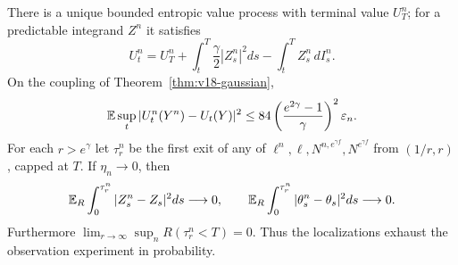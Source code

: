 \begin{theorem}
\label{thm:v18-entropic}
There is a unique bounded entropic value process with terminal value
$U_T^n$; for a predictable integrand $Z^n$ it satisfies
\begin{equation}\label{eq:v18-bsde}
 U_t^n=U_T^n+\int_t^T\frac\gamma2|Z_s^n|^2ds
                        -\int_t^T Z_s^n\,dI_s^n.
\end{equation}
On the coupling of Theorem~\ref{thm:v18-gaussian},
\begin{equation}\label{eq:v18-entropiccoupling}
 \mathbb E\sup_t|U_t^n(Y^n)-U_t(Y)|^2
       \le84\left(\frac{e^{2\gamma}-1}{\gamma}\right)^2
                                                     \varepsilon_n.
\end{equation}
For each $r>e^\gamma$ let $\tau_r^n$ be the first exit of any of
$\ell^n,\ell,N^{n,e^{\gamma f}},N^{e^{\gamma f}}$ from $(1/r,r)$, capped
at $T$. If $\eta_n\to0$, then
\begin{equation}\label{eq:v18-bsdeintegrands}
 \mathbb E_R\int_0^{\tau_r^n}|Z_s^n-Z_s|^2ds\longrightarrow0,
 \qquad
 \mathbb E_R\int_0^{\tau_r^n}|\theta_s^n-\theta_s|^2ds\longrightarrow0.
\end{equation}
Furthermore $\lim_{r\to\infty}\sup_n R(\tau_r^n<T)=0$. Thus the
localizations exhaust the observation experiment in probability.
\end{theorem}
